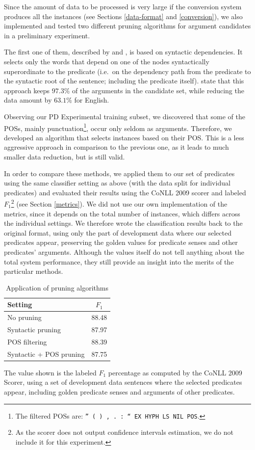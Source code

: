 \documentclass[12pt,notitlepage]{report}
\begin{document}
Since the amount of data to be processed is very large if the conversion system produces all the instances (see Sections \ref{data-format} and \ref{conversion}), we also implemented and tested two different pruning algorithms for argument candidates in a preliminary experiment. 

The first one of them, described by \citet{asahara09} and \citet{zhao09}, is based on syntactic dependencies. It selects only the words that depend on one of the nodes syntactically superordinate to the predicate (i.e.\ on the dependency path from the predicate to the syntactic root of the sentence; including the predicate itself). \citeauthor{asahara09} state that this approach keeps $97.3\%$ of the arguments in the candidate set, while reducing the data amount by $63.1\%$ for English.

Observing our PD Experimental training subset, we discovered that some of the POSs, mainly punctuation\footnote{The filtered POSs are: \texttt{'' ( ) , . : `` EX HYPH LS NIL POS}.}, occur only seldom as arguments. Therefore, we developed an algorithm that selects instances based on their POS. This is a less aggressive approach in comparison to the previous one, as it leads to much smaller data reduction, but is still valid.

In order to compare these methods, we applied them to our set of predicates using the same classifier setting as above (with the data split for individual predicates) and evaluated their results using the CoNLL 2009 scorer and labeled $F_1$\footnote{As the scorer does not output confidence intervals estimation, we do not include it for this experiment.} (see Section \ref{metrics}). We did not use our own implementation of the metrics, since it depends on the total number of instances, which differs across the individual settings. We therefore wrote the classification results back to the original format, using only the part of development data where our selected predicates appear, preserving the golden values for predicate senses and other predicates' arguments. Although the values itself do not tell anything about the total system performance, they still provide an insight into the merits of the particular methods.

\begin{table}[htb]\label{tab:prune}
\caption{Application of pruning algorithms}\footnotesize
\begin{center}
\begin{tabular}{|l|c|}\hline
\bf Setting & $F_1$ \\\hline
No pruning & 88.48 \\
Syntactic pruning & 87.97 \\
POS filtering & 88.39 \\
Syntactic + POS pruning & 87.75 \\\hline
\end{tabular}
\end{center}
The value shown is the labeled $F_1$ percentage as computed by the CoNLL 2009 Scorer, using a set of development data sentences where the selected predicates appear, including golden predicate senses and arguments of other predicates.
\end{table}
\end{document}
